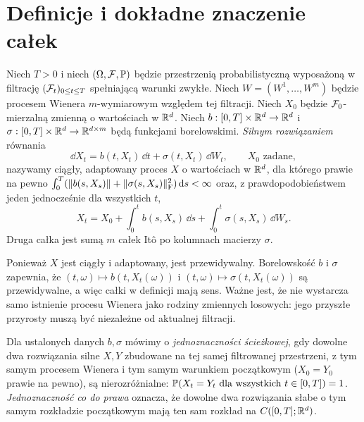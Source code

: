 \section{Definicje i dokładne znaczenie całek}
\begin{definicja}
\label{def:sde-strong}
Niech $T>0$ i niech $(\Omega,\mathcal{F},\mathbb{P})$ będzie
przestrzenią probabilistyczną wyposażoną w filtrację
$(\mathcal{F}_t)_{0\le t\le T}$ spełniającą warunki zwykłe.
Niech $W=(W^1,\ldots,W^m)$ będzie procesem Wienera
$m$-wymiarowym względem tej filtracji. Niech $X_0$ będzie
$\mathcal{F}_0$-mierzalną zmienną o wartościach w $\mathbb{R}^d$.
Niech $b:[0,T]\times\mathbb{R}^d\to\mathbb{R}^d$ i
$\sigma:[0,T]\times\mathbb{R}^d\to\mathbb{R}^{d\times m}$
będą funkcjami borelowskimi. \emph{Silnym rozwiązaniem} równania
\[
\dd X_t=b(t,X_t)\,\dd t+\sigma(t,X_t)\,\dd W_t,
\qquad X_0\text{ zadane},
\tag{5.1}\label{eq:sde}
\]
nazywamy ciągły, adaptowany proces $X$ o wartościach w $\mathbb{R}^d$,
dla którego prawie na pewno
$\int_0^T (\lVert b(s,X_s)\rVert+\lVert \sigma(s,X_s)\rVert_{\mathrm F}^2)\,\mathrm{d} s<\infty$
oraz, z prawdopodobieństwem jeden jednocześnie dla wszystkich $t$,
\[
X_t=X_0+\int_0^tb(s,X_s)\,\dd s
       +\int_0^t\sigma(s,X_s)\,\dd W_s.
\]
Druga całka jest sumą $m$ całek Itô po kolumnach macierzy $\sigma$.
\end{definicja}

\begin{uwaga}
Ponieważ $X$ jest ciągły i adaptowany, jest przewidywalny.
Borelowskość $b$ i $\sigma$ zapewnia, że
$(t,\omega)\mapsto b(t,X_t(\omega))$ i
$(t,\omega)\mapsto\sigma(t,X_t(\omega))$ są przewidywalne,
a więc całki w definicji mają sens. Ważne jest, że nie wystarcza
samo istnienie procesu Wienera jako rodziny zmiennych losowych:
jego przyszłe przyrosty muszą być niezależne od aktualnej filtracji.
\end{uwaga}

\begin{definicja}
Dla ustalonych danych $b,\sigma$ mówimy o
\emph{jednoznaczności ścieżkowej}, gdy dowolne dwa rozwiązania
silne $X,Y$ zbudowane na tej samej filtrowanej przestrzeni,
z tym samym procesem Wienera i tym samym warunkiem początkowym
($X_0=Y_0$ prawie na pewno), są nierozróżnialne:
$\mathbb{P}(X_t=Y_t\ \text{dla wszystkich }t\in[0,T])=1$.
\emph{Jednoznaczność co do prawa} oznacza, że dowolne dwa
rozwiązania słabe o tym samym rozkładzie początkowym mają
ten sam rozkład na $C([0,T];\mathbb{R}^d)$.
\end{definicja}

